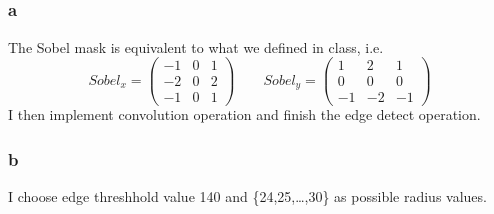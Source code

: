 \documentclass[12pt,letterpaper]{article}
\begin{document}
\subsection{}
\subsubsection*{a}
The Sobel mask is equivalent to what we defined in class, i.e.
$$Sobel_{x}=
\begin{pmatrix}
  -1 & 0 & 1\\
  -2 & 0 & 2\\
  -1 & 0 & 1
\end{pmatrix} \qquad
Sobel_{y}=
\begin{pmatrix}
  1 & 2 & 1\\
  0 & 0 & 0\\
  -1 & -2 & -1
\end{pmatrix}
$$
I then implement convolution operation and finish the edge detect operation.
\subsubsection*{b}
I choose edge threshhold value 140 and \{24,25,\dots,30\} as possible radius values.
\end{document}
